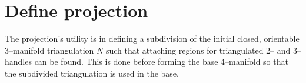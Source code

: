 \section{Define projection}

The projection's utility is in defining a subdivision of the initial closed, orientable 3--manifold triangulation $N$ such that attaching regions for triangulated 2-- and 3--handles can be found.
This is done before forming the base 4--manifold so that the subdivided triangulation is used in the base.